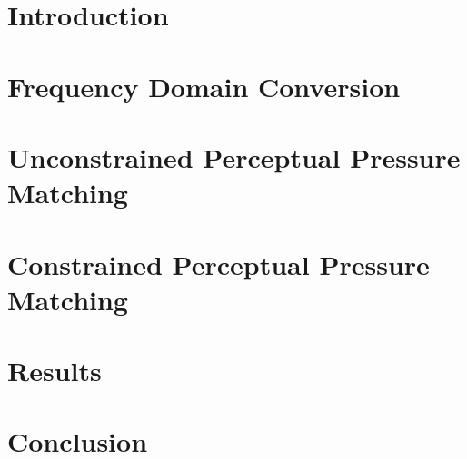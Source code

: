 \documentclass[10pt,twoside,openright,titlepage]{ce}
\begin{document}
\section{Introduction}
\label{ch:perceptual_sound_zone:introduction}

\newpage
\section{Frequency Domain Conversion}
\label{ch:perceptual_sound_zone:frequency_domain_conversion}

\newpage
\section{Unconstrained Perceptual Pressure Matching}
\label{ch:perceptual_sound_zone:perceptual_minimization}

\newpage
\section{Constrained Perceptual Pressure Matching}
\label{ch:perceptual_sound_zone:perceptual_constraining}

\newpage
\section{Results}
\label{ch:perceptual_sound_zone:results}

\newpage
\section{Conclusion}
\label{ch:perceptual_sound_zone:conclusion}


% 
% 
% 
% 
% 
% 
\end{document}
